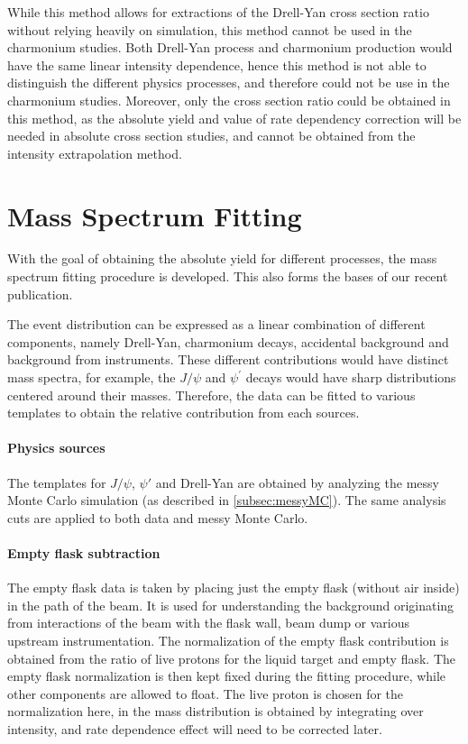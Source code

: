 \documentclass[../main.tex]{subfiles}
\begin{document}


While this method allows for extractions of the Drell-Yan cross section ratio without relying
heavily on simulation, this method cannot be used in the charmonium studies.
Both Drell-Yan process and charmonium production would have the same linear intensity dependence,
hence this method is not able to distinguish the different physics processes, and therefore could
not be use in the charmonium studies. Moreover, only the cross section ratio could be obtained in
this method, as the absolute yield and value of rate dependency correction will be needed in
absolute cross section studies, and cannot be obtained from the intensity extrapolation method.

\section{Mass Spectrum Fitting}
With the goal of obtaining the absolute yield for different processes, the mass spectrum fitting
procedure is developed. This also forms the bases of our recent publication\cite{dove2023}.

The event distribution can be expressed as a linear combination of different components,
namely Drell-Yan, charmonium decays, accidental background and background from instruments.
These different contributions would have distinct mass spectra, for example, the $J/\psi$
and $\psi^\prime$ decays would have sharp distributions centered around their masses.
Therefore, the data can be fitted to various templates to obtain
the relative contribution from each sources.

\paragraph{Physics sources}
The templates for $J/\psi$, $\psi'$ and Drell-Yan are obtained by analyzing the messy Monte Carlo
simulation (as described in \cref{subsec:messyMC}). The same analysis cuts are applied to both data
and messy Monte Carlo. 

\paragraph{Empty flask subtraction}
The empty flask data is taken by placing just the empty flask (without air inside) in the path of
the beam. It is used for understanding the background originating from interactions of the beam
with the flask wall, beam dump or various upstream instrumentation. The normalization of the
empty flask contribution is obtained from the ratio of live protons for the liquid target and
empty flask. The empty flask normalization is then kept fixed during the fitting procedure, while
other components are allowed to float. The live proton is chosen for the normalization here, in the 
mass distribution is obtained by integrating over intensity, and rate dependence effect will need
to be corrected later.
\end{document}
